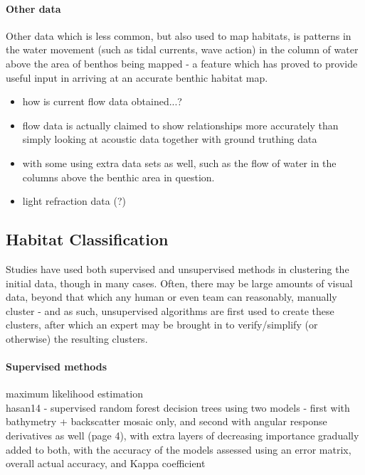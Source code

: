 \documentclass[12pt]{article}
\begin{document}
\begin{multicols}{2}
            \paragraph{Other data}
            Other data which is less common, but also used to map habitats, is patterns in the water movement (such as tidal currents, wave action)\citep{cjbrown11} in the column of water above the area of benthos being mapped - a feature which has proved to provide useful input in arriving at an accurate benthic habitat map.\citep{snelgrove94}

            \begin{itemize}
                \item how is current flow data obtained...? 
                \item flow data is actually claimed to show relationships more accurately than simply looking at acoustic data together with ground truthing data \citep{kostylev12}
                \item with some using extra data sets as well, such as the flow of water in the columns above the benthic area in question.\citep{cjbrown11}
                \item light refraction data (?)
            \end{itemize}

            \subsection{Habitat Classification}

            Studies have used both supervised and unsupervised methods in clustering the initial data, though in many cases. Often, there may be large amounts of visual data, beyond that which any human or even team can reasonably, manually cluster - and as such, unsupervised algorithms are first used to create these clusters, after which an expert may be brought in to verify/simplify (or otherwise) the resulting clusters.\citep{steinberg11} 

            \paragraph{Supervised methods}
            maximum likelihood estimation \citep{Micallef12} \\
            hasan14 - supervised random forest decision trees using two models - first with bathymetry + backscatter mosaic only, and second with angular response derivatives as well (page 4), with extra layers of decreasing importance gradually added to both, with the accuracy of the models assessed using an error matrix, overall actual accuracy, and Kappa coefficient \citep{hasan14}


\end{multicols}
\end{document}
